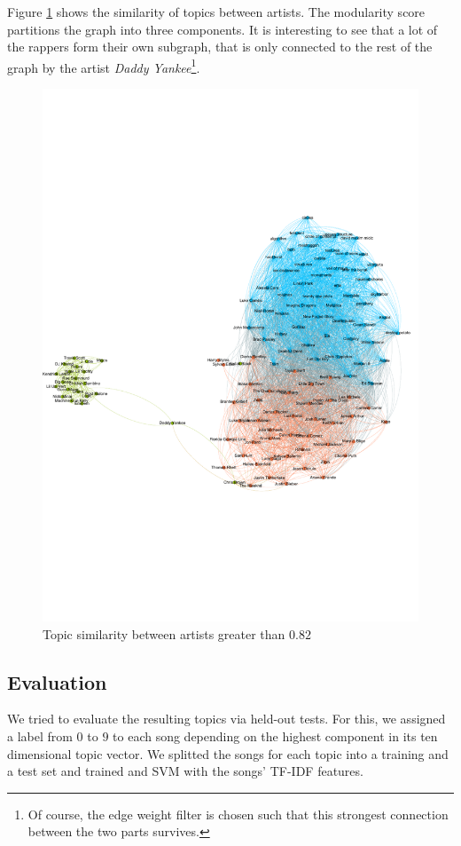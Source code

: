 \documentclass[10pt,a4paper]{article}
\begin{document}
		Figure \ref{fig:topicsimilarity} shows the similarity of topics between artists. The modularity score partitions the graph into three components. It is interesting to see that a lot of the rappers form their own subgraph, that is only connected to the rest of the graph by the artist \textit{Daddy Yankee}\footnote{Of course, the edge weight filter is chosen such that this strongest connection between the two parts survives.}.
		
		\begin{figure}[htb]
			\centering
			\includegraphics[trim=0mm 70mm 0mm 70mm, clip, width=\linewidth]{data/topic_similarity}
				\caption{Topic similarity between artists greater than $0.82$}
				\label{fig:topicsimilarity}
		\end{figure}
		
		\subsection{Evaluation}
		We tried to evaluate the resulting topics via held-out tests. For this, we assigned a label from $0$ to $9$ to each song depending on the highest component in its ten dimensional topic vector. We splitted the songs for each topic into a training and a test set and trained and SVM with the songs' TF-IDF features.
		
\end{document}
